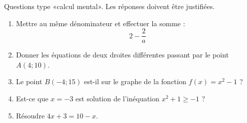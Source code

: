 
\begin{exercice}\label{exosmath-0693}

    Questions type «calcul mental». Les réponses doivent être justifiées.
    \begin{multicols}{2}
        \begin{enumerate}
            \item
                Mettre au même dénominateur et effectuer la somme :
                \begin{equation}
                    2-\frac{ 2 }{ a }
                \end{equation}
            \item
                Donner les équations de deux droites différentes passant par le point \( A(4;10)\).
            \item
                Le point \( B(-4;15)\) est-il sur le graphe de la fonction \( f(x)=x^2-1\) ?
            \item
                Est-ce que \( x=-3\) est solution de l'inéquation \( x^2+1\geq -1\) ?
            \item
                Résoudre $4x+3=10-x$.
        \end{enumerate}
    \end{multicols}

\end{exercice}
